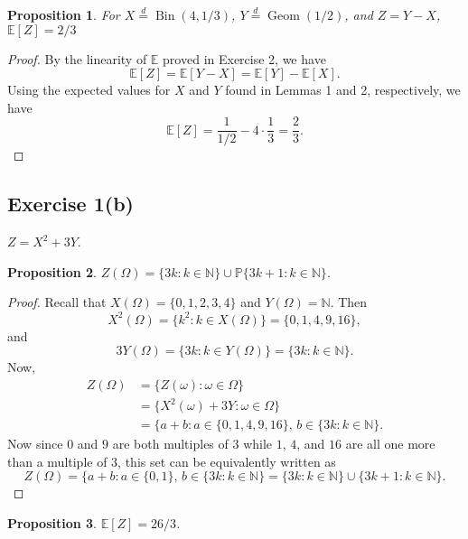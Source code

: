 \documentclass[12pt]{article}
\newtheorem{proposition}{Proposition}
\newenvironment{problem}
    {\begin{lrbox}{\mybox}\begin{minipage}{0.98\textwidth}}
    {\end{minipage}\end{lrbox}\framebox[\textwidth]{\usebox{\mybox}}}
\newcommand{\N}{\mathbb{N}} %
\renewcommand{\P}{\mathbb{P}} %
\newcommand{\E}{\mathbb{E}} %
\newcommand{\<}{\left\langle} %
\renewcommand{\>}{\right\rangle} %
\begin{document}
\begin{proposition}
    For $X \overset{d}{=} \operatorname{Bin}(4, 1/3)$, $Y \overset{d}{=} \operatorname{Geom}(1/2)$, and $Z = Y - X$, $\E[Z] = 2/3$
\end{proposition}

\begin{proof}
    By the linearity of $\E$ proved in Exercise 2, we have
    \[\E[Z] = \E[Y - X] = \E[Y] - \E[X].\]
    Using the expected values for $X$ and $Y$ found in Lemmas 1 and 2, respectively, we have
    \[\E[Z] = \frac1{1/2} - 4\cdot\frac13 = \frac23.\]
    
\end{proof}

\newpage
\subsection*{Exercise 1(b)}
\begin{problem}
    $Z = X^2 + 3Y$.
\end{problem}

\begin{proposition}
    $Z(\Omega) = \{3k : k \in \N\} \cup \P\{3k + 1 : k \in \N\}$.
\end{proposition}

\begin{proof}
    Recall that $X(\Omega) = \{0, 1, 2, 3, 4\}$ and $Y(\Omega) = \N$. Then
    \[X^2(\Omega) = \{k^2 : k\in X(\Omega)\} = \{0, 1, 4, 9, 16\},\]
    and
    \[3Y(\Omega) = \{3k : k\in Y(\Omega)\} = \{3k : k \in \N\}.\]
    Now,
    \begin{align*}
        Z(\Omega)
            &= \{Z(\omega) : \omega \in \Omega\} \\
            &= \{X^2(\omega) + 3Y : \omega \in \Omega\} \\
            &= \{a + b : a \in \{0, 1, 4, 9, 16\},\, b \in \{3k : k \in \N\}.
    \end{align*}
    Now since $0$ and $9$ are both multiples of 3 while $1$, $4$, and $16$ are all one more than a multiple of 3, this set can be equivalently written as
    \[Z(\Omega) = \{a + b : a \in \{0, 1\},\, b \in \{3k : k \in \N\} = \{3k : k\in\N\}\cup\{3k + 1 : k\in\N\}.\]
    
\end{proof}

\begin{proposition}
    $\E[Z] = 26/3$.
\end{proposition}
\end{document}
